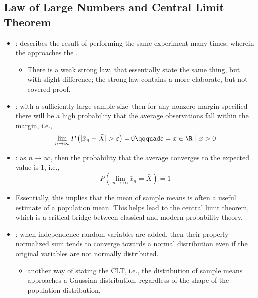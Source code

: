 \begin{itemize}
  \subsection{Law of Large Numbers and Central Limit Theorem}
  \begin{itemize}
    \item {}: describes the result of performing the same experiment many times, wherein the \hyperref[Subsection: Measures of Central Tendency]{} approaches the \hyperref[Section: Sampling]{}.
      \begin{itemize}
        \item There is a weak strong law, that essentially state the same thing, but with slight difference; the strong law contains a more elaborate, but not covered proof.
      \end{itemize}
    \item {}: with a sufficiently large sample size, then for any nonzero margin specified there will be a high probability that the average observations fall within the margin, i.e.,
    \[%
    \lim_{n\to \infty} P\left(|\bar{x}_n-\bar{X}| > \varepsilon\right) = 0 \qqquad \varepsilon = {x\in\R~|~x > 0}
    \]%
    \item {}: as \(n \to \infty\), then the probability that the average converges to the expected value is 1, i.e.,
    \[%
    P\left(\lim_{n\to\infty}\bar{x}_n=\bar{X}\right)=1
    \]%
    \item Essentially, this implies that the mean of sample means is often a useful estimate of a population mean. This helps lead to the central limit theorem, which is a critical bridge between classical and modern probability theory. 
    \item {}: when independence random variables are added, then their properly normalized sum tends to converge towards a normal distribution even if the original variables are not normally distributed.
      \begin{itemize}
        \item {} another way of stating the CLT, i.e., the distribution of sample means approaches a Gaussian distribution, regardless of the shape of the population distribution.
      \end{itemize}
    \end{itemize}
\end{itemize}

